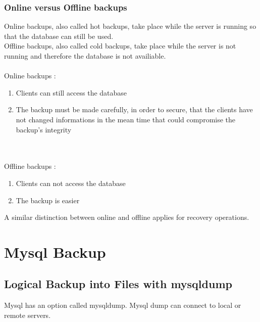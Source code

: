 \documentclass[10pt]{article}
\begin{document}
\subsubsection{Online versus Offline backups}
Online backups, also called hot backups, take place while the server is running so that the database can still be used.\\
Offline backups, also called cold backups, take place while the server is not running and therefore the database is not availiable. \\ \\
Online backups :
\begin{enumerate}
\item Clients can still access the database
\item The backup must be made carefully, in order to secure, that the clients have not changed informations in the mean time that could compromise the backup's integrity
\end{enumerate} \cite{mysqlbackupandrectypesman}\\ \\
Offline backups :
\begin{enumerate}
\item Clients can not access the database
\item The backup is easier
\end{enumerate}
A similar distinction between online and offline applies for recovery operations.
 \cite{mysqlbackupandrectypesman}
\newpage
\section{Mysql Backup}
\subsection{Logical Backup into Files with mysqldump}
Mysql has an option called mysqldump. Mysql dump can connect to local or remote servers.\cite{mysqlbackupandrectypesman}
\end{document}
